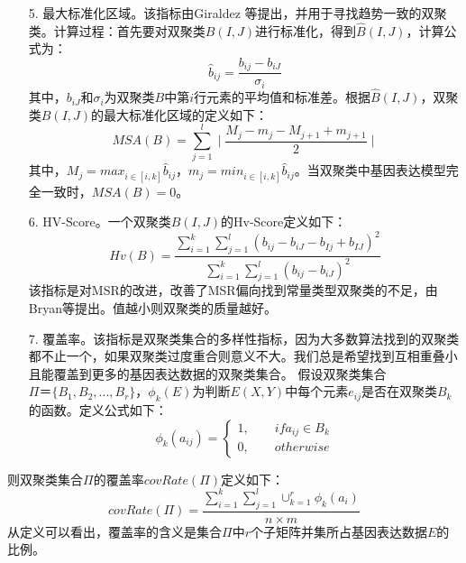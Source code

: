\begin{enumerate}
    \item[5.] 最大标准化区域。该指标由Giraldez 等提出，并用于寻找趋势一致的双聚类。计算过程：首先要对双聚类$B(I,J)$进行标准化，得到$\hat{B}(I,J)$，计算公式为：
    \begin{equation}
      \hat{b}_{ij} = \frac{b_{ij}-b_{iJ}}{\sigma_i}
    \end{equation}
    \hspace{2em} 其中，$b_{iJ}$和$\sigma_i$为双聚类$B$中第$i$行元素的平均值和标准差。根据$\hat{B}(I,J)$，双聚类$B(I,J)$的最大标准化区域的定义如下：
    \begin{equation}
      MSA(B) = \sum_{j=1}^l \mid \frac{M_j-m_j-M_{j+1}+m_{j+1}}{2}\mid
    \end{equation}
    \hspace{2em} 其中，$M_j=max_{i\in [i,k]}\hat{b}_{ij}$，$m_j=min_{i\in [i,k]}\hat{b}_{ij}$。当双聚类中基因表达模型完全一致时，$MSA(B)=0$。

    \item[6.] HV-Score。一个双聚类$B(I, J)$的Hv-Score定义如下：
    \begin{equation}
     Hv(B) = \frac{\sum_{i=1}^k \sum_{j=1}^l(b_{ij}-b_{iJ}-b_{Ij}+b_{IJ})^2}{\sum_{i=1}^k \sum_{j=1}^l(b_{ij}-b_{iJ})^2}
    \end{equation}
    该指标是对MSR的改进，改善了MSR偏向找到常量类型双聚类的不足，由Bryan等提出。值越小则双聚类的质量越好。

    \item[7.] 覆盖率。该指标是双聚类集合的多样性指标，因为大多数算法找到的双聚类都不止一个，如果双聚类过度重合则意义不大。我们总是希望找到互相重叠小且能覆盖到更多的基因表达数据的双聚类集合。 假设双聚类集合$\Pi＝\{B_1,B_2,...,B_r\}$，$\phi_k(E)$为判断$E(X,Y)$中每个元素$e_{ij}$是否在双聚类$B_k$的函数。定义公式如下：
    \begin{equation}
    \phi_k(a_{ij})  = \left\{
      \begin{aligned}
       1 ,\hspace{2em}  if a_{ij} \in B_k \\
       0 ,\hspace{2em}  otherwise 
      \end{aligned}
    \right.
    \end{equation}
  \end{enumerate}
  \hspace{2em}则双聚类集合$\Pi$的覆盖率$covRate(\Pi)$定义如下：
  \begin{equation}
   covRate(\Pi) = \frac{\sum_{i=1}^k\sum_{j=1}^l\cup_{k=1}^r\phi_k(a_i)}{n \times m} 
  \end{equation}
  \hspace{2em}从定义可以看出，覆盖率的含义是集合$\Pi$中$r$个子矩阵并集所占基因表达数据$E$的比例。

